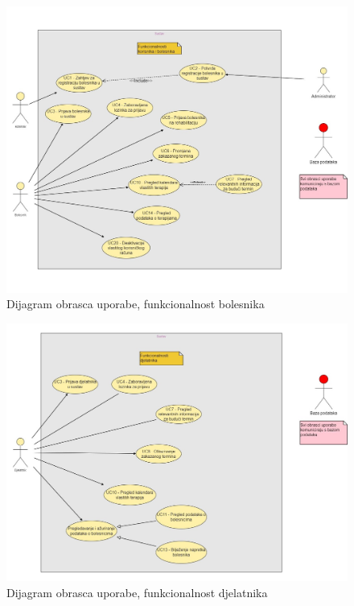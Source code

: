\begin{figure}[h]
    \centering
    \includegraphics[width=\textwidth]{./slike/UC Dijagram - Bolesnik} 
    \caption{Dijagram obrasca uporabe, funkcionalnost bolesnika}
    \label{fig:my_image}
\end{figure}

\begin{figure}[bp]
    \centering
    \includegraphics[width=\textwidth]{./slike/UC Dijagram - Djelatnik} 
    \caption{Dijagram obrasca uporabe, funkcionalnost djelatnika}
    \label{fig:my_image}
\end{figure}

